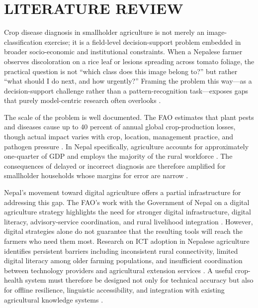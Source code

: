 \chapter{LITERATURE REVIEW}


Crop disease diagnosis in smallholder agriculture is not merely an image-classification exercise;
it is a field-level decision-support problem embedded in broader socio-economic and
institutional constraints. When a Nepalese farmer observes discoloration on a rice leaf or
lesions spreading across tomato foliage, the practical question is not ``which class does this
image belong to?'' but rather ``what should I do next, and how urgently?'' Framing the problem
this way---as a decision-support challenge rather than a pattern-recognition task---exposes gaps
that purely model-centric research often overlooks
\parencite{fabregatAgriDSSSurvey2023,desilvaICT4DAgriculture2023}.

The scale of the problem is well documented. The FAO estimates that plant pests and diseases
cause up to 40 percent of annual global crop-production losses, though actual impact varies
with crop, location, management practice, and pathogen pressure
\parencite{faoPlantHealthLosses}. In Nepal specifically, agriculture accounts for approximately
one-quarter of GDP and employs the majority of the rural workforce
\parencite{moaldAgricultureStats2080,nsoAgricultureCensus2021}. The consequences of delayed or
incorrect diagnosis are therefore amplified for smallholder households whose margins for error
are narrow \parencite{pandeyCropLossNepal2022}.

Nepal's movement toward digital agriculture offers a partial infrastructure for addressing
this gap. The FAO's work with the Government of Nepal on a digital agriculture strategy
highlights the need for stronger digital infrastructure, digital literacy, advisory-service
coordination, and rural livelihood integration \parencite{faoNepalDigitalAgriculture}. However,
digital strategies alone do not guarantee that the resulting tools will reach the farmers who
need them most. Research on ICT adoption in Nepalese agriculture identifies persistent
barriers including inconsistent rural connectivity, limited digital literacy among older
farming populations, and insufficient coordination between technology providers and
agricultural extension services \parencite{khatriNepalDigitalAgri2023}. A useful
crop-health system must therefore be designed not only for technical accuracy but also for
offline resilience, linguistic accessibility, and integration with existing agricultural
knowledge systems \parencite{silvestriSmallholderTechAdoption2021}.

